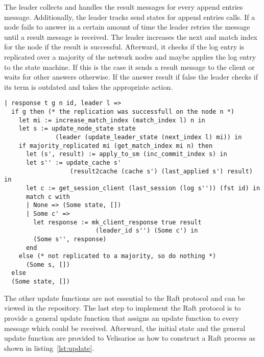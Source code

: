 The leader collects and handles the result messages for every append entries
message. Additionally, the leader tracks send states for append entries calls.
If a node fails to answer in a certain amount of time the leader retries
the message until a result message is received.
The leader increases the next and match index for the node if the result is
successful. Afterward, it checks if the log entry is replicated over a majority
of the network nodes and maybe applies the log entry to the state machine.
If this is the case it sends a result message to the client or waits for
other answers otherwise.
If the answer result if false the leader checks if its term is outdated and
takes the appropriate action.

\begin{lstlisting}[style=coq,label=lst:rreplicate,
caption=Handle incoming responses for replication requests as leader.]
| response t g n id, leader l =>
  if g then (* the replication was successfull on the node n *)
    let mi := increase_match_index (match_index l) n in
    let s := update_node_state state 
              (leader (update_leader_state (next_index l) mi)) in
    if majority_replicated mi (get_match_index mi n) then
      let (s', result) := apply_to_sm (inc_commit_index s) in
      let s'' := update_cache s'
                  (result2cache (cache s') (last_applied s') result) in
      let c := get_session_client (last_session (log s'')) (fst id) in
      match c with
      | None => (Some state, [])
      | Some c' =>
        let response := mk_client_response true result 
                         (leader_id s'') (Some c') in
        (Some s'', response)
      end
    else (* not replicated to a majority, so do nothing *)
      (Some s, [])
  else
  (Some state, [])
\end{lstlisting}

The other update functions are not essential to the Raft protocol
and can be viewed in the repository. The last step to implement the
Raft protocol is to provide a general update function
that assigns an update function to every message which could
be received. Afterward, the initial state and the general
update function are provided to Velisarios as how to construct
a Raft process as shown in listing~\ref{lst:update}.

